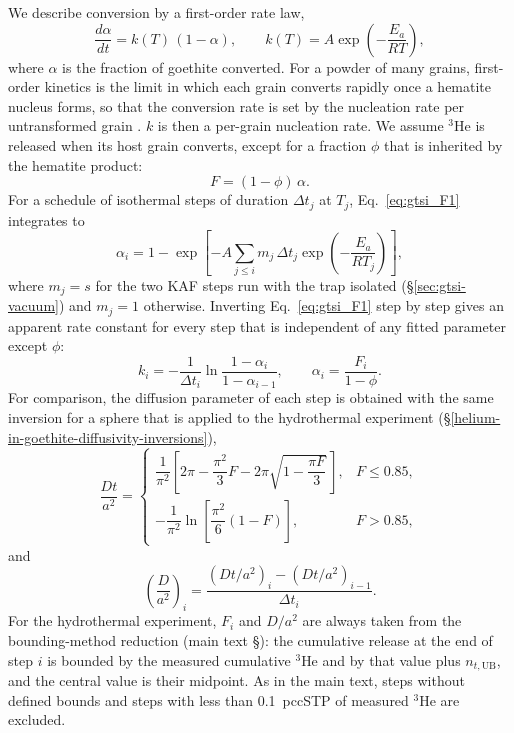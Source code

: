 We describe conversion by a first-order rate law,
\begin{equation}
  \frac{d\alpha}{dt} = k(T)\,(1-\alpha),
  \qquad
  k(T) = A\exp\!\left(-\frac{E_a}{RT}\right),
  \label{eq:gtsi_F1}
\end{equation}
where $\alpha$ is the fraction of goethite converted. For a powder of many grains, first-order
kinetics is the limit in which each grain converts rapidly once a hematite nucleus forms, so
that the conversion rate is set by the nucleation rate per untransformed grain
\citep{mampel1940}. $k$ is then a per-grain nucleation rate. We assume $^3$He is released when
its host grain converts, except for a fraction $\phi$ that is inherited by the hematite
product:
\begin{equation}
  F = (1-\phi)\,\alpha .
  \label{eq:gtsi_Fphi}
\end{equation}
For a schedule of isothermal steps of duration $\Delta t_j$ at $T_j$, Eq.~\eqref{eq:gtsi_F1}
integrates to
\begin{equation}
  \alpha_i = 1 - \exp\!\left[-A\sum_{j\le i} m_j\,\Delta t_j \exp\!\left(-\frac{E_a}{RT_j}\right)\right],
  \label{eq:gtsi_F1_cum}
\end{equation}
where $m_j = s$ for the two KAF steps run with the trap isolated (\S\ref{sec:gtsi-vacuum}) and $m_j=1$
otherwise. Inverting Eq.~\eqref{eq:gtsi_F1} step by step gives an apparent rate constant for every
step that is independent of any fitted parameter except $\phi$:
\begin{equation}
  k_i = -\frac{1}{\Delta t_i}\ln\frac{1-\alpha_i}{1-\alpha_{i-1}},
  \qquad \alpha_i = \frac{F_i}{1-\phi}.
  \label{eq:gtsi_stepk}
\end{equation}
For comparison, the diffusion parameter of each step is obtained with the same
\citet{fechtigkalbitzer1966} inversion for a sphere that is applied to the hydrothermal
experiment (\S\ref{helium-in-goethite-diffusivity-inversions}),
\begin{equation}
  \frac{Dt}{a^2} =
  \begin{cases}
    \dfrac{1}{\pi^2}\left[2\pi - \dfrac{\pi^2}{3}F - 2\pi\sqrt{1-\dfrac{\pi F}{3}}\,\right], & F \le 0.85,\\[2ex]
    -\dfrac{1}{\pi^2}\ln\!\left[\dfrac{\pi^2}{6}(1-F)\right], & F > 0.85,
  \end{cases}
  \label{eq:gtsi_FK}
\end{equation}
and
\begin{equation*}
  \left(\frac{D}{a^2}\right)_i = \frac{(Dt/a^2)_i - (Dt/a^2)_{i-1}}{\Delta t_i}.
\end{equation*}
For the hydrothermal experiment, $F_i$ and $D/a^2$ are always taken from the bounding-method
reduction (main text \S\MainRefBounding): the cumulative release at the end of step $i$ is
bounded by the measured cumulative $^3$He and by that value plus $n_{t,\mathrm{UB}}$, and the
central value is their midpoint. As in the main text, steps without defined bounds and
steps with less than 0.1~pccSTP of measured $^3$He are excluded.

